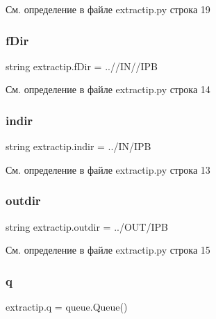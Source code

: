 См. определение в файле extractip.\+py строка 19

\mbox{\label{namespaceextractip_afc77b990583eaef27725f54b1e371fd4}} 
\subsubsection{\texorpdfstring{f\+Dir}{fDir}}
{\footnotesize\ttfamily string extractip.\+f\+Dir = \textquotesingle{}..//IN//I\+PB\textquotesingle{}}



См. определение в файле extractip.\+py строка 14

\mbox{\label{namespaceextractip_a3145a105043353658277d58cb99ff1c6}} 
\subsubsection{\texorpdfstring{indir}{indir}}
{\footnotesize\ttfamily string extractip.\+indir = \textquotesingle{}../IN/I\+PB\textquotesingle{}}



См. определение в файле extractip.\+py строка 13

\mbox{\label{namespaceextractip_a990ac0d0fba3b9b0eff9e0538af6d7cf}} 
\subsubsection{\texorpdfstring{outdir}{outdir}}
{\footnotesize\ttfamily string extractip.\+outdir = \textquotesingle{}../O\+UT/I\+PB\textquotesingle{}}



См. определение в файле extractip.\+py строка 15

\mbox{\label{namespaceextractip_a2cf221bd199a42f6c0e3a42cba40b841}} 
\subsubsection{\texorpdfstring{q}{q}}
{\footnotesize\ttfamily extractip.\+q = queue.\+Queue()}



